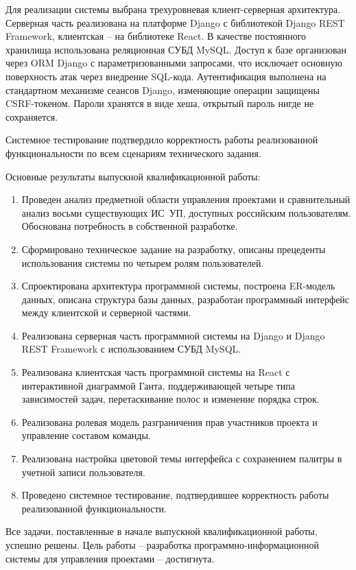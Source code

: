 Для реализации системы выбрана трехуровневая клиент-серверная архитектура. Серверная часть реализована на платформе Django с библиотекой Django REST Framework, клиентская -- на библиотеке React. В качестве постоянного хранилища использована реляционная СУБД MySQL. Доступ к базе организован через ORM Django с параметризованными запросами, что исключает основную поверхность атак через внедрение SQL-кода. Аутентификация выполнена на стандартном механизме сеансов Django, изменяющие операции защищены CSRF-токеном. Пароли хранятся в виде хеша, открытый пароль нигде не сохраняется.

Системное тестирование подтвердило корректность работы реализованной функциональности по всем сценариям технического задания.

Основные результаты выпускной квалификационной работы:
\begin{enumerate}
    \item Проведен анализ предметной области управления проектами и сравнительный анализ восьми существующих ИС~УП, доступных российским пользователям. Обоснована потребность в собственной разработке.
    \item Сформировано техническое задание на разработку, описаны прецеденты использования системы по четырем ролям пользователей.
    \item Спроектирована архитектура программной системы, построена ER-модель данных, описана структура базы данных, разработан программный интерфейс между клиентской и серверной частями.
    \item Реализована серверная часть программной системы на Django и Django REST Framework с использованием СУБД MySQL.
    \item Реализована клиентская часть программной системы на React с интерактивной диаграммой Ганта, поддерживающей четыре типа зависимостей задач, перетаскивание полос и изменение порядка строк.
    \item Реализована ролевая модель разграничения прав участников проекта и управление составом команды.
    \item Реализована настройка цветовой темы интерфейса с сохранением палитры в учетной записи пользователя.
    \item Проведено системное тестирование, подтвердившее корректность работы реализованной функциональности.
\end{enumerate}

Все задачи, поставленные в начале выпускной квалификационной работы, успешно решены. Цель работы -- разработка программно-информационной системы для управления проектами -- достигнута.
